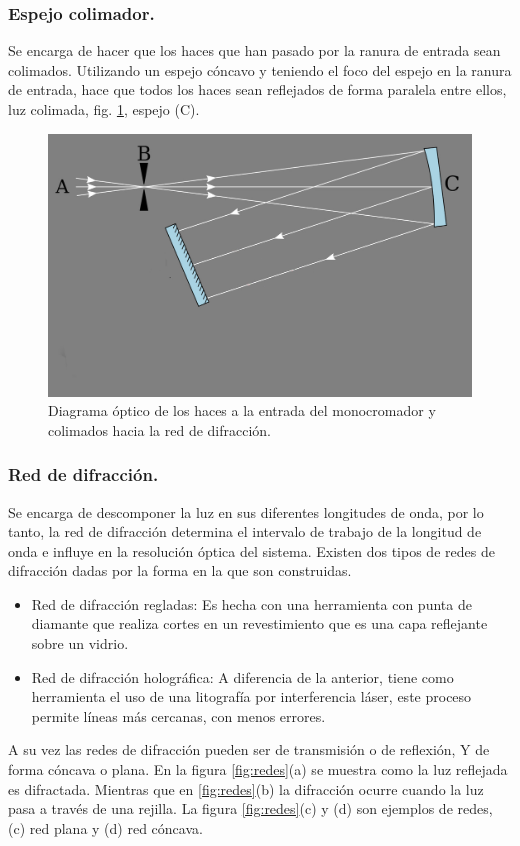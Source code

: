 \subsubsection{Espejo colimador.}
Se encarga de hacer que los haces que han pasado por la ranura de entrada sean colimados. Utilizando un espejo cóncavo y teniendo el foco del espejo en la ranura de entrada, hace que todos los haces sean reflejados de forma paralela entre ellos, luz colimada, fig. \ref{fig:colimarluz}, espejo (C). 

\begin{figure}[h]
	\centering
	\includegraphics[width=0.6\linewidth]{Imagenes/ColimarLuz}
	\caption{Diagrama óptico de los haces a la entrada del monocromador y colimados hacia la red de difracción. \cite{Czerny-Turney-Conf}}
	\label{fig:colimarluz}
\end{figure}

\subsubsection{Red de difracción.}
Se encarga de descomponer la luz en sus diferentes longitudes de onda, por lo tanto, la red de difracción determina el intervalo de trabajo de la longitud de onda e influye en la resolución óptica del sistema. 
Existen dos tipos de redes de difracción dadas por la forma en la que son construidas.
\begin{itemize}
	\item Red de difracción regladas: Es hecha con una herramienta con punta de diamante que realiza cortes en un revestimiento que es una capa reflejante sobre un vidrio.
	\item Red de difracción holográfica: A diferencia de la anterior, tiene como herramienta el uso de una litografía por interferencia láser, este proceso permite líneas más cercanas, con menos errores.
\end{itemize}

A su vez las redes de difracción pueden ser de transmisión o de reflexión, Y de forma cóncava o plana. En la figura \ref{fig:redes}(a) se muestra como la luz reflejada es difractada. Mientras que en \ref{fig:redes}(b) la difracción ocurre cuando la luz pasa a través de una rejilla. La figura \ref{fig:redes}(c) y (d) son ejemplos de redes, (c) red plana y (d) red cóncava.

